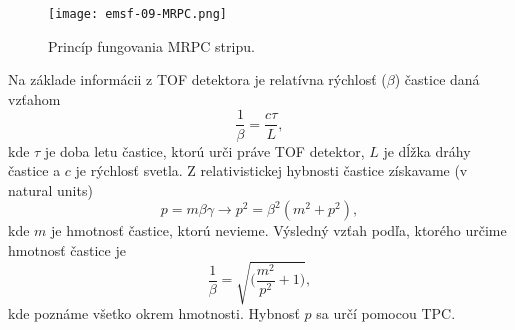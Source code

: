 \documentclass[../../main.tex]{subfiles}
\begin{document}
\begin{figure}[!h]
\texttt{[image: emsf-09-MRPC.png]}
\centering
\caption{Princíp fungovania MRPC stripu.}
\label{em9:fig:MRPC}
\end{figure}

Na základe informácii z TOF detektora je relatívna rýchlosť ($\beta$) častice daná vzťahom
$$ \frac{1}{\beta} = \frac{c\tau}{L}, $$
kde $\tau$ je doba letu častice, ktorú urči práve TOF detektor, $L$ je dĺžka dráhy častice a $c$ je rýchlosť svetla.
Z relativistickej hybnosti častice získavame (v natural units)
$$ p = m \beta \gamma  \rightarrow p^2 = \beta^2 (m^2+p^2),$$
kde $m$ je hmotnosť častice, ktorú nevieme. Výsledný vzťah podľa, ktorého určime hmotnosť častice je
$$ \frac{1}{\beta} = \sqrt{\bigg( \frac{m^2}{p^2}+1 \bigg)},$$
kde poznáme všetko okrem hmotnosti. Hybnosť $p$ sa určí pomocou TPC.
\end{document}
